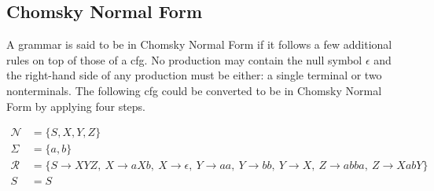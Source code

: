 \documentclass[../Document.tex]{subfiles}
\begin{document}
\subsection{Chomsky Normal Form}
A grammar is said to be in Chomsky Normal Form if it follows a few additional rules on top of those of a \gls{cfg}. No production may contain the null symbol $\epsilon$ and the right-hand side of any production must be either: a single terminal or two nonterminals. The following \gls{cfg} could be converted to be in Chomsky Normal Form by applying four steps.

\begin{align*}
    \mathcal{N} &= \{S,X,Y,Z\}\\
    \Sigma &= \{a,b\}\\
    \mathcal{R} &= \{ S \rightarrow XYZ ,\  X \rightarrow aXb ,\  X \rightarrow \epsilon ,\  Y \rightarrow aa ,\   Y \rightarrow bb ,\ Y \rightarrow X ,\ Z \rightarrow abba ,\ Z \rightarrow XabY \}\\
    S &= S\\
\end{align*}
\end{document}
